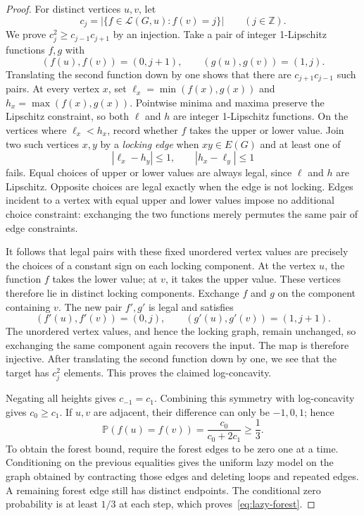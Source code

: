 \documentclass[11pt,reqno]{amsart}
\theoremstyle{remark}
\numberwithin{equation}{section}
\newcommand{\Z}{\mathbb Z}
\newcommand{\PP}{\mathbb P}
\newcommand{\LL}{\mathcal L}
\begin{document}
\begin{proof}
For distinct vertices $u,v$, let
\[
 c_j=|\{f\in\LL(G,u):f(v)=j\}|\qquad(j\in\Z).
\]
We prove $c_j^2\ge c_{j-1}c_{j+1}$ by an injection. Take a pair of
integer 1-Lipschitz functions $f,g$ with
\[
 (f(u),f(v))=(0,j+1),\qquad (g(u),g(v))=(1,j).
\]
Translating the second function down by one shows that there are
$c_{j+1}c_{j-1}$ such pairs. At every vertex $x$, set
$\ell_x=\min(f(x),g(x))$ and $h_x=\max(f(x),g(x))$.
Pointwise minima and maxima preserve the Lipschitz constraint, so both
$\ell$ and $h$ are integer 1-Lipschitz functions.
On the vertices where $\ell_x<h_x$, record whether $f$ takes the upper
or lower value. Join two such vertices $x,y$ by a \emph{locking edge}
when $xy\in E(G)$ and at least one of
\[
 |\ell_x-h_y|\le1,\qquad |h_x-\ell_y|\le1
\]
fails. Equal choices of upper or lower values are always legal, since
$\ell$ and $h$ are Lipschitz. Opposite choices are legal exactly when
the edge is not locking. Edges incident to a vertex with equal upper
and lower values impose no additional choice constraint: exchanging
the two functions merely permutes the same pair of edge constraints.

It follows that legal pairs with these fixed unordered vertex values
are precisely the choices of a constant sign on each locking component.
At the vertex $u$, the function $f$ takes the lower value; at $v$, it
takes the upper value. These vertices therefore lie in distinct locking
components. Exchange $f$ and $g$ on the component containing $v$.
The new pair $f',g'$ is legal and satisfies
\[
 (f'(u),f'(v))=(0,j),\qquad
 (g'(u),g'(v))=(1,j+1).
\]
The unordered vertex values, and hence the locking graph, remain
unchanged, so exchanging the same component again recovers the input.
The map is therefore injective. After translating the second function
down by one, we see that the target has $c_j^2$ elements. This proves
the claimed log-concavity.

Negating all heights gives $c_{-1}=c_1$. Combining this symmetry with
log-concavity gives $c_0\ge c_1$.
If $u,v$ are adjacent, their difference can only be $-1,0,1$; hence
\[
 \PP(f(u)=f(v))=\frac{c_0}{c_0+2c_1}\ge\frac13.
\]
To obtain the forest bound, require the forest edges to be zero one
at a time.
Conditioning on the previous equalities gives the uniform lazy model
on the graph obtained by contracting those edges and deleting loops
and repeated edges. A remaining forest edge still has distinct
endpoints. The conditional zero probability is at least $1/3$ at
each step, which proves~\eqref{eq:lazy-forest}.
\end{proof}
\end{document}
